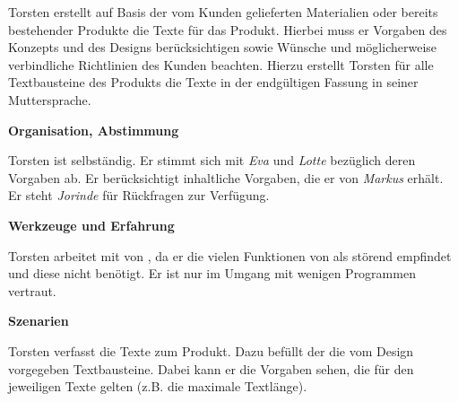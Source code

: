 \begin{multicols}{2}

\begin{center}
\end{center}


Torsten erstellt auf Basis der vom Kunden gelieferten Materialien oder bereits bestehender Produkte die Texte für das Produkt. Hierbei muss er Vorgaben des Konzepts und des Designs berücksichtigen sowie Wünsche und möglicherweise verbindliche Richtlinien des Kunden beachten. Hierzu erstellt Torsten für alle Textbausteine des Produkts die Texte in der endgültigen Fassung in seiner Muttersprache.

\textbf{Organisation, Abstimmung}

Torsten ist selbständig. Er stimmt sich mit \emph{Eva} und \emph{Lotte} bezüglich deren Vorgaben ab. Er berücksichtigt inhaltliche Vorgaben, die er von \emph{Markus} erhält. Er steht  \emph{Jorinde} für Rückfragen zur Verfügung.

\textbf{Werkzeuge und Erfahrung}

Torsten arbeitet mit  von , da er die vielen Funktionen von  als störend empfindet und diese nicht benötigt. Er ist nur im Umgang mit wenigen Programmen vertraut.

\columnbreak

\textbf{Szenarien}

Torsten verfasst die Texte zum Produkt. Dazu befüllt der die vom Design vorgegeben Textbausteine. Dabei kann er die Vorgaben sehen, die für den jeweiligen Texte gelten (z.B. die maximale Textlänge). 


\end{multicols}
